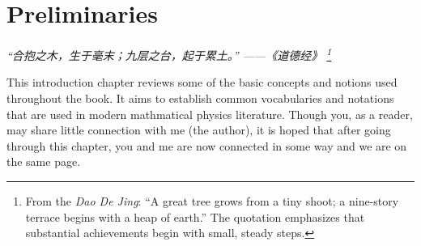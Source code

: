 \chapter{Preliminaries}
\renewcommand{\currentchapterpath}{chapters/ch01/}

\begin{flushright}
\textit{“合抱之木，生于毫末；九层之台，起于累土。” ——《道德经》
\footnote{From the \textit{Dao De Jing}: ``A great tree grows from a tiny shoot; a nine-story terrace begins with a heap of earth.'' The quotation emphasizes that substantial achievements begin with small, steady steps.}}
\end{flushright}

This introduction chapter reviews some of the basic concepts and notions used 
throughout the book. It aims to establish common vocabularies 
 and notations that are used in modern mathmatical physics literature.
 Though you, as a reader, may share little connection with me (the author),
  it is hoped that after going through this chapter,
 you and me are now connected in some way and we are on the same page.


 

